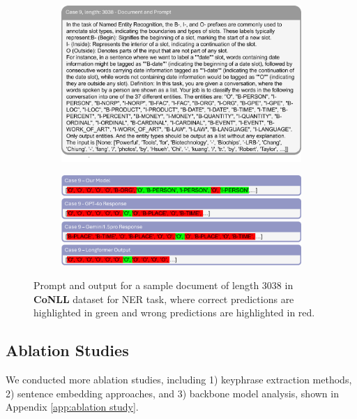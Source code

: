 \documentclass[11pt]{article}
\begin{document}
\begin{figure}[!h]
    \centering
    \begin{subfigure}[b]{1.0\linewidth}   
        \includegraphics[width=\textwidth]{images/case9_prompt.png} 
    \end{subfigure}
    \vspace{1pt}
    \begin{subfigure}[b]{1.0\linewidth}  
        \includegraphics[width=\textwidth]{images/case9_ans.png}
    \end{subfigure}
    \caption{Prompt and output for a sample document of length 3038 in \textbf{CoNLL} dataset for NER task, where correct predictions are highlighted in green and wrong predictions are highlighted in red.}
    \label{case9}
\end{figure}

\subsection{Ablation Studies}
We conducted more ablation studies, including 1) keyphrase extraction methods, 2) sentence embedding approaches, and 3) backbone model analysis, shown in Appendix \ref{app:ablation study}.
\end{document}
